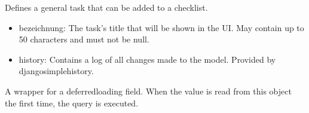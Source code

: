 \documentclass[letterpaper,10pt,english]{sphinxmanual}
\begin{document}
\begin{fulllineitems}
\label{\detokenize{masterCodeDoc:checklisten.models.Aufgabe}}
Defines a general task that can be added to a checklist.
\begin{itemize}
\item {} 
bezeichnung: The task’s title that will be shown in the UI. May contain up to 50 characters and must not be null.

\item {} 
history: Contains a log of all changes made to the model. Provided by django\sphinxhyphen{}simple\sphinxhyphen{}history.

\end{itemize}

\begin{fulllineitems}
\label{\detokenize{masterCodeDoc:checklisten.models.Aufgabe.DoesNotExist}}
\end{fulllineitems}


\begin{fulllineitems}
\label{\detokenize{masterCodeDoc:checklisten.models.Aufgabe.MultipleObjectsReturned}}
\end{fulllineitems}


\begin{fulllineitems}
\label{\detokenize{masterCodeDoc:checklisten.models.Aufgabe.bezeichnung}}
A wrapper for a deferred\sphinxhyphen{}loading field. When the value is read from this
object the first time, the query is executed.

\end{fulllineitems}



\end{fulllineitems}
\end{document}
